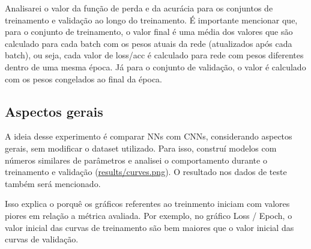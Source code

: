 \documentclass[11pt,a4paper]{article}
\begin{document}
\hypertarget{explicacao-dinamica-loss}{}Analisarei o valor da função de perda e da acurácia para os conjuntos de treinamento e validação ao longo do treinamento. É importante mencionar que, para o conjunto de treinamento, o valor final é uma média dos valores que são calculado para cada batch com os pesos atuais da rede (atualizados após cada batch), ou seja, cada valor de loss/acc é calculado para rede com pesos diferentes dentro de uma mesma época. Já para o conjunto de validação, o valor é calculado com os pesos congelados ao final da época.

\subsection{Aspectos gerais}

A ideia desse experimento é comparar NNs com CNNs, considerando aspectos gerais, sem modificar o dataset utilizado. Para isso, construí modelos com números similares de parâmetros e analisei o comportamento durante o treinamento e validação (\href{https://github.com/deconr/MAC5921-DeepLearning/blob/main/ep1/results/curves.png}{results/curves.png}). O resultado nos dados de teste também será mencionado.

Isso explica o porquê os gráficos referentes ao treinmento iniciam com valores piores em relação a métrica avaliada. Por exemplo, no gráfico Loss / Epoch, o valor inicial das curvas de treinamento são bem maiores que o valor inicial das curvas de validação.
\end{document}

